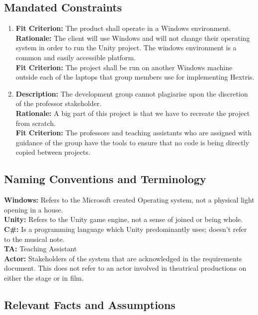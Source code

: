 \documentclass[12pt, titlepage]{article}
\begin{document}
\subsection{Mandated Constraints}
\begin{enumerate}[label=C\arabic*]
\item \textbf{Fit Criterion:} The product shall operate in a Windows environment. \\
\textbf{Rationale:} The client will use Windows and will not change their operating system in order to run the Unity project. The windows environment is a common and easily accessible platform.\\
\textbf{Fit Criterion:} The project shall be run on another Windows machine outside each of the laptops that group members use for implementing Hextris. 

\newpage

\item \textbf{Description:} The development group cannot plagiarise upon the discretion of the professor stakeholder. \\
\textbf{Rationale:} A big part of this project is that we have to recreate the project from scratch. \\
\textbf{Fit Criterion:} The professors and teaching assistants who are assigned with guidance of the group have the tools to ensure that no code is being directly copied between projects. 
\end{enumerate}



\subsection{Naming Conventions and Terminology}
\noindent \textbf{Windows:} Refers to the Microsoft created Operating system, not a physical light opening in a house.\\
\textbf{Unity:} Refers to the Unity game engine, not a sense of joined or being whole.\\
\textbf{C\#:} Is a programming language which Unity predominantly uses; doesn’t refer to the musical note.\\
\textbf{TA:} Teaching Assistant\\
\textbf{Actor:} Stakeholders of the system that are acknowledged in the requirements document. This does not refer to an actor involved in theatrical productions on either the stage or in film.\\
\subsection{Relevant Facts and Assumptions}
\end{document}
